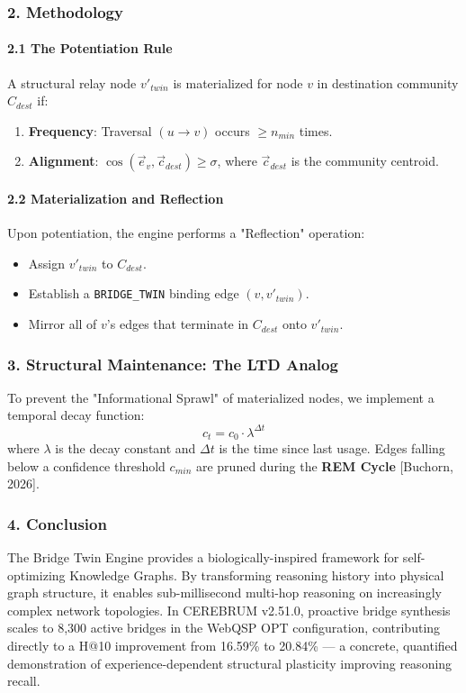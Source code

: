 \subsubsection{2. Methodology}

\paragraph{2.1 The Potent\-iation Rule}
A structural relay node $v'_{twin}$ is mater\-ialized for node $v$ in destination community $C_{dest}$ if:
\begin{enumerate}
\item \textbf{Frequency}: Traversal $(u \to v)$ occurs $\geq n_{min}$ times.
\item \textbf{Alignment}: $\cos(\vec{e}_v, \vec{c}_{dest}) \geq \sigma$, where $\vec{c}_{dest}$ is the community centroid.

\end{enumerate}
\paragraph{2.2 Materi\-alization and Reflection}
Upon poten\-tiation, the engine performs a "Reflection" operation:
\begin{itemize}
\item Assign $v'_{twin}$ to $C_{dest}$.
\item Establish a \texttt{BRIDGE\_TWIN} binding edge $(v, v'_{twin})$.
\item Mirror all of $v$'s edges that terminate in $C_{dest}$ onto $v'_{twin}$.

\end{itemize}
\subsubsection{3. Structural Maintenance: The LTD Analog}
To prevent the "Inform\-ational Sprawl" of mater\-ialized nodes, we implement a temporal decay function:
\begin{equation}
c_t = c_0 \cdot \lambda^{\Delta t}
\end{equation}
where $\lambda$ is the decay constant and $\Delta t$ is the time since last usage. Edges falling below a confidence threshold $c_{min}$ are pruned during the \textbf{REM Cycle} [Buchorn, 2026].

\subsubsection{4. Conclusion}
The Bridge Twin Engine provides a biolo\-gically-inspired framework for self-optimizing Knowledge Graphs. By trans\-forming reasoning history into physical graph structure, it enables sub-millisecond multi-hop reasoning on incre\-asingly complex network topologies. In CEREBRUM v2.51.0, proactive bridge synthesis scales to 8,300 active bridges in the WebQSP OPT confi\-guration, contr\-ibuting directly to a H@10 improvement from 16.59\% to 20.84\% — a concrete, quantified demon\-stration of experience-dependent structural plasticity improving reasoning recall.

